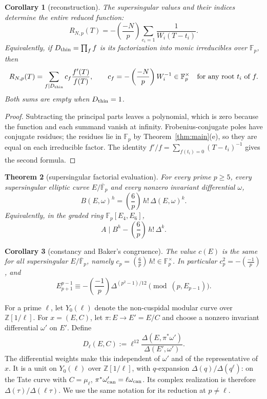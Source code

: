 \documentclass[11pt,a4paper]{article}
\numberwithin{equation}{section}
\newtheorem{theorem}{Theorem}[section]
\newtheorem{corollary}[theorem]{Corollary}
\theoremstyle{definition}
\theoremstyle{remark}
\newcommand{\Fp}{\mathbb F_p}
\newcommand{\Fb}{\overline{\mathbb F}_p}
\newcommand{\Z}{\mathbb Z}
\newcommand{\Lp}[1]{\left(\frac{#1}{p}\right)}
\begin{document}
\begin{corollary}[reconstruction]\label{cor:reconstruction}
The supersingular values and their indices determine the entire reduced function:
\begin{equation}\label{eq:partial-fractions}
R_{N,p}(T)=-\Lp{-N}\sum_{e_i=1}\frac{1}{W_i(T-t_i)}.
\end{equation}
Equivalently, if $D_{\rm thin}=\prod_f f$ is its factorization into monic
irreducibles over $\Fp$, then
\begin{equation}\label{eq:factor-reconstruction}
R_{N,p}(T)=\sum_{f\mid D_{\rm thin}} c_f\frac{f'(T)}{f(T)},\qquad
c_f=-\Lp{-N}W_i^{-1}\in\Fp^\times\quad\text{for any root }t_i\text{ of }f.
\end{equation}
Both sums are empty when $D_{\rm thin}=1$.
\end{corollary}
\begin{proof}
Subtracting the principal parts leaves a polynomial, which is zero because the
function and each summand vanish at infinity. Frobenius-conjugate poles have
conjugate residues; the residues lie in $\Fp$ by Theorem~\ref{thm:main}(e), so
they are equal on each irreducible factor. The identity
$f'/f=\sum_{f(t_i)=0}(T-t_i)^{-1}$ gives the second formula.
\end{proof}

\begin{theorem}[supersingular factorial evaluation]\label{thm:factorial}
For every prime $p\ge5$, every supersingular elliptic curve $E/\Fb$ and
every nonzero invariant differential $\omega$,
\begin{equation}\label{eq:factorial-evaluation}
B(E,\omega)^h=\Lp6\,h!\,\Delta(E,\omega)^k.
\end{equation}
Equivalently, in the graded ring $\Fp[E_4,E_6]$,
\begin{equation}\label{eq:factorial-divisibility}
A\mid B^h-\Lp6\,h!\,\Delta^k.
\end{equation}
\end{theorem}

\begin{corollary}[constancy and Baker's congruence]\label{cor:D}
The value $c(E)$ is the same for all supersingular $E/\Fb$, namely
$c_p=\Lp6\,h!\in\Fp^\times$. In particular
$c_p^2=-\Lp{-1}$, and
\[
E_{p+1}^{p-1}\equiv-\Lp{-1}\Delta^{(p^2-1)/12}
\pmod{(p,E_{p-1})}.
\]
\end{corollary}

For a prime $\ell$, let $Y_0(\ell)$ denote the non-cuspidal modular
curve over $\Z[1/\ell]$. For $x=(E,C)$, let $\pi:E\to E'=E/C$ and
choose a nonzero invariant differential $\omega'$ on $E'$. Define
\begin{equation}\label{eq:Dmoduli}
D_\ell(E,C):=\ell^{12}
\frac{\Delta(E,\pi^*\omega')}{\Delta(E',\omega')}.
\end{equation}
The differential weights make this independent of $\omega'$ and of the
representative of $x$. It is a unit on $Y_0(\ell)$ over $\Z[1/\ell]$,
with $q$-expansion $\Delta(q)/\Delta(q^\ell)$: on the Tate curve with
$C=\mu_\ell$, $\pi^*\omega'_{\rm can}=\ell\omega_{\rm can}$.
Its complex realization is therefore $\Delta(\tau)/\Delta(\ell\tau)$.
We use the same notation for its reduction at $p\ne\ell$.
\end{document}

